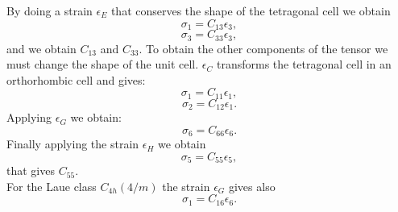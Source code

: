 \documentclass[12pt,a4paper]{article}
\begin{document}
By doing a strain $\epsilon_E$ that conserves the shape of the tetragonal
cell we obtain
\begin{equation}
\sigma_{1} = C_{13} \epsilon_3,
\end{equation}
\begin{equation}
\sigma_{3} = C_{33} \epsilon_3,
\end{equation}
and we obtain $C_{13}$ and $C_{33}$.
To obtain the other components of the tensor we must change the shape of the 
unit cell. $\epsilon_C$ transforms the tetragonal cell in an orthorhombic cell 
and gives:
\begin{equation}
\sigma_{1} = C_{11} \epsilon_1, 
\end{equation}
\begin{equation}
\sigma_{2} = C_{12} \epsilon_1.
\end{equation}
Applying $\epsilon_G$ we obtain:
\begin{equation}
\sigma_{6} = C_{66} \epsilon_6.
\end{equation}
Finally applying the strain $\epsilon_H$ we obtain
\begin{equation}
\sigma_{5} = C_{55} \epsilon_5,
\end{equation}
that gives $C_{55}$. \\
For the Laue class $C_{4h} (4/m)$ the strain $\epsilon_G$ gives also 
\begin{equation}
\sigma_{1} = C_{16} \epsilon_6.
\end{equation}
\end{document}
